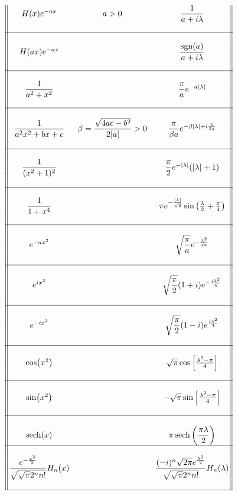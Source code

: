 \documentclass[../complete.tex]{subfiles}
\begin{document}
\begin{center}
\begin{equation*}
\begin{Vmatrix}
		H(x)e^{-ax} & a>0 & \dfrac{1}{a+i\lambda}\\
		\\\hline\\
		H(ax)e^{-ax} && \dfrac{\sgn(a)}{a+i\lambda} \\
		\\\hline\\
		\dfrac{1}{a^2+x^2} && \dfrac{\pi}{a}e^{-a\abs{\lambda}} \\
		\\\hline\\
		\dfrac{1}{a^2x^2+bx+c} & \beta=\dfrac{\sqrt{4ac-b^2}}{2\abs{a}}>0 & \dfrac{\pi}{\beta a} e^{-\beta\abs{\lambda}+i\frac{\lambda}{2a}}  \\
		\\\hline\\
		\dfrac{1}{(x^2+1)^2} & & \dfrac{\pi}{2}e^{-\abs{\lambda}}(\abs{\lambda}+1) \\
		\\\hline\\
		\dfrac{1}{1+x^4}&& \pi e^{-\frac{\abs{\lambda}}{\sqrt{2}}}\sin\left(\frac{\lambda}{2}+\frac{\pi}{4}\right) \\
		\\\hline\\
		e^{-ax^2} && \sqrt{\dfrac{\pi}{a}}e^{-\frac{\lambda^2}{4a}} \\
		\\\hline\\
		e^{ix^2} && \sqrt{\dfrac{\pi}{2}}(1+i)e^{-\frac{i\lambda^2}{4}}\\
		\\\hline\\
		e^{-ix^2}&&\sqrt{\dfrac{\pi}{2}}(1-i)e^{\frac{i\lambda^2}{4}}\\
		\\\hline\\
		\cos(x^2) & &\sqrt{\pi}\cos\left[ \frac{\lambda^2-\pi}{4} \right] \\
		\\\hline\\
		\sin(x^2)  && -\sqrt{\pi}\sin\left[ \frac{\lambda^2-\pi}{4} \right] \\
		\\\hline\\
		\sech(x)&&\pi\sech\left( \dfrac{\pi\lambda}{2} \right)
		\\\hline\\
		\dfrac{e^{-\frac{x^2}{2}}}{\sqrt{\sqrt{\pi}2^nn!}}H_n(x) && \dfrac{(-i)^n\sqrt{2\pi}e^{\frac{\lambda^2}{2}}}{\sqrt{\sqrt{\pi}2^nn!}}H_n(\lambda) \\
		\\\hline
	\end{Vmatrix}
\end{equation*}
\end{center}
\end{document}
